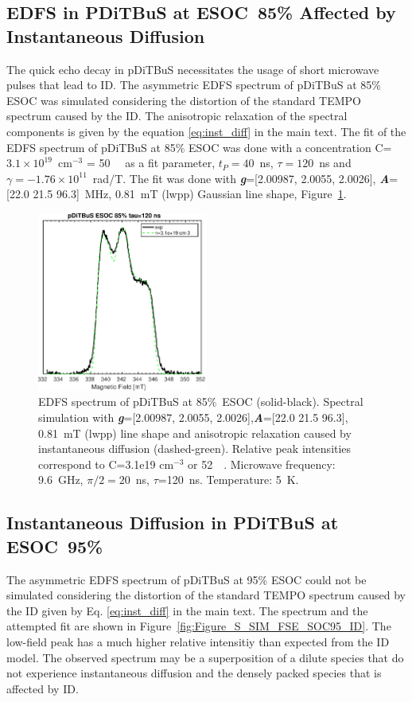 \newpage
\subsection{EDFS in PDiTBuS at ESOC~85\% Affected by Instantaneous Diffusion}
The quick echo decay in pDiTBuS necessitates the usage of short microwave pulses that lead to ID. The asymmetric EDFS spectrum of pDiTBuS at 85\% ESOC was simulated considering the distortion of the standard TEMPO spectrum caused by the ID. The anisotropic relaxation of the spectral components is given by the equation \ref{eq:inst_diff} in the main text. The fit of the EDFS spectrum of pDiTBuS at 85\% ESOC was done with a concentration C=$3.1\times10^{19}$~cm$^{-3}$ = 50~\si{\milli\Molar} as a fit parameter, $t_P=40$~ns, $\tau=120$~ns and $\gamma=-1.76\times10^{11}$~rad/T. The fit was done with \textit{\textbf{g}}=[2.00987, 2.0055, 2.0026], \textit{\textbf{A}}=[22.0 21.5 96.3]~MHz, 0.81~mT (lwpp) Gaussian line shape, Figure~\ref{fig:Figure_S23}.

\begin{figure}[ht!]
  \centering
	\includegraphics[width=0.5\textwidth]{./pulse/figures/Figure_S23.pdf}
	\caption{EDFS spectrum of pDiTBuS at 85\%~ESOC (solid-black). Spectral simulation with \textit{\textbf{g}}=[2.00987, 2.0055, 2.0026],\textit{\textbf{A}}=[22.0 21.5 96.3], 0.81~mT (lwpp)  line shape and anisotropic relaxation caused by instantaneous diffusion (dashed-green). Relative peak intensities correspond to C=3.1e19 cm$^{-3}$ or 52~\si{\milli\Molar}. Microwave frequency: 9.6~GHz, $\pi/2=20$~ns, $\tau$=120~ns. Temperature: 5~K.}
	\label{fig:Figure_S23}
\end{figure}


\newpage


\subsection{Instantaneous Diffusion in PDiTBuS at ESOC~95\% }
\label{esi:fse_sims_ID_full}
The asymmetric EDFS spectrum of pDiTBuS at 95\% ESOC could not be simulated considering the distortion of the standard TEMPO spectrum caused by the ID given by Eq. \ref{eq:inst_diff} in the main text. The spectrum and the attempted fit are shown in Figure~\ref{fig:Figure_S_SIM_FSE_SOC95_ID}. The low-field peak has a much higher relative intensitiy than expected from the ID model. The observed spectrum may be a superposition of a dilute species that do not experience instantaneous diffusion and the densely packed species that is affected by ID.\\

